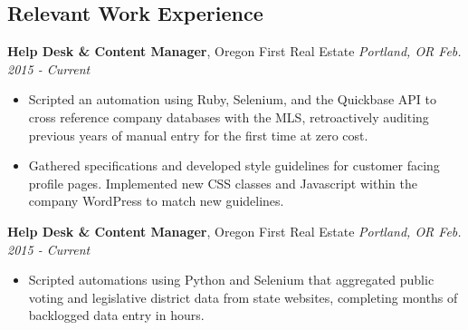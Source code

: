 \documentclass[11pt,line,center]{res}
\begin{document}
\address{ddykes2@gmail.com | 971-238-4828 | github.com/rsq2}
\begin{resume}

\bigskip

\section{\sectionfontt\normalsize Relevant Work Experience}
    {\bfseries\footnotesize  Help Desk & Content Manager}, Oregon First Real Estate \hill \textit{Portland, OR Feb. 2015 - Current}\\
        \vspace{-5mm}
        \begin{itemize}
            \setlength\itemsep{1em}
            \item Scripted an automation using Ruby, Selenium, and the Quickbase API to cross reference company databases with the MLS,
                  retroactively auditing previous years of manual entry for the first time at zero cost.\\
            \item Gathered specifications and developed style guidelines for customer facing profile pages. Implemented new CSS classes
                  and Javascript within the company WordPress to match new guidelines.\\
        \end{itemize}

    {\bfseries\footnotesize  Help Desk & Content Manager}, Oregon First Real Estate \hill \textit{Portland, OR Feb. 2015 - Current}\\
        \vspace{-5mm}
        \begin{itemize}
            \setlength\itemsep{1em}
            \item Scripted automations using Python and Selenium that aggregated public voting and legislative district data from state
                  websites, completing months of backlogged data entry in hours. \\
        \end{itemize}



\end{resume}
\end{document}
